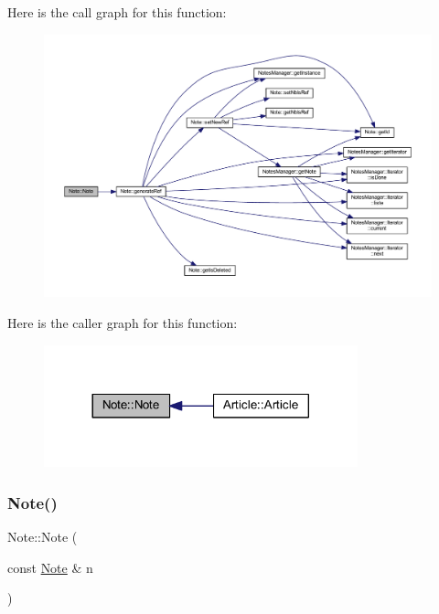 Here is the call graph for this function\+:\nopagebreak
\begin{figure}[H]
\begin{center}
\leavevmode
\includegraphics[width=350pt]{class_note_a0490153115307d5f59974d7000260e48_cgraph}
\end{center}
\end{figure}
Here is the caller graph for this function\+:\nopagebreak
\begin{figure}[H]
\begin{center}
\leavevmode
\includegraphics[width=257pt]{class_note_a0490153115307d5f59974d7000260e48_icgraph}
\end{center}
\end{figure}
\mbox{\label{class_note_ac06fd282c05bbfe2e1675fe0677b2efb}} 
\subsubsection{\texorpdfstring{Note()}{Note()}\hspace{0.1cm}{\footnotesize\ttfamily [2/2]}}
{\footnotesize\ttfamily Note\+::\+Note (\begin{DoxyParamCaption}\item[{const \hyperlink{class_note}{Note} \&}]{n }\end{DoxyParamCaption})}



